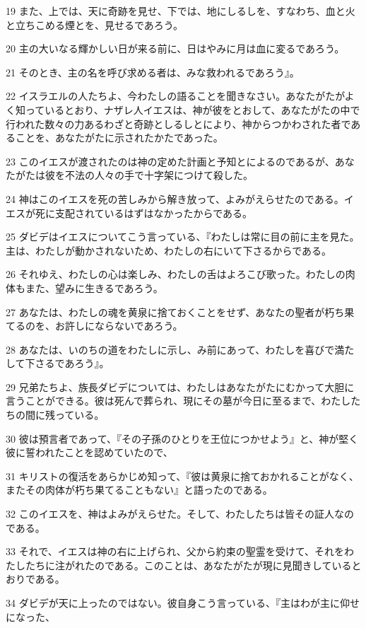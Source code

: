 \par 19 また、上では、天に奇跡を見せ、下では、地にしるしを、すなわち、血と火と立ちこめる煙とを、見せるであろう。
\par 20 主の大いなる輝かしい日が来る前に、日はやみに月は血に変るであろう。
\par 21 そのとき、主の名を呼び求める者は、みな救われるであろう』。
\par 22 イスラエルの人たちよ、今わたしの語ることを聞きなさい。あなたがたがよく知っているとおり、ナザレ人イエスは、神が彼をとおして、あなたがたの中で行われた数々の力あるわざと奇跡としるしとにより、神からつかわされた者であることを、あなたがたに示されたかたであった。
\par 23 このイエスが渡されたのは神の定めた計画と予知とによるのであるが、あなたがたは彼を不法の人々の手で十字架につけて殺した。
\par 24 神はこのイエスを死の苦しみから解き放って、よみがえらせたのである。イエスが死に支配されているはずはなかったからである。
\par 25 ダビデはイエスについてこう言っている、『わたしは常に目の前に主を見た。主は、わたしが動かされないため、わたしの右にいて下さるからである。
\par 26 それゆえ、わたしの心は楽しみ、わたしの舌はよろこび歌った。わたしの肉体もまた、望みに生きるであろう。
\par 27 あなたは、わたしの魂を黄泉に捨ておくことをせず、あなたの聖者が朽ち果てるのを、お許しにならないであろう。
\par 28 あなたは、いのちの道をわたしに示し、み前にあって、わたしを喜びで満たして下さるであろう』。
\par 29 兄弟たちよ、族長ダビデについては、わたしはあなたがたにむかって大胆に言うことができる。彼は死んで葬られ、現にその墓が今日に至るまで、わたしたちの間に残っている。
\par 30 彼は預言者であって、『その子孫のひとりを王位につかせよう』と、神が堅く彼に誓われたことを認めていたので、
\par 31 キリストの復活をあらかじめ知って、『彼は黄泉に捨ておかれることがなく、またその肉体が朽ち果てることもない』と語ったのである。
\par 32 このイエスを、神はよみがえらせた。そして、わたしたちは皆その証人なのである。
\par 33 それで、イエスは神の右に上げられ、父から約束の聖霊を受けて、それをわたしたちに注がれたのである。このことは、あなたがたが現に見聞きしているとおりである。
\par 34 ダビデが天に上ったのではない。彼自身こう言っている、『主はわが主に仰せになった、
